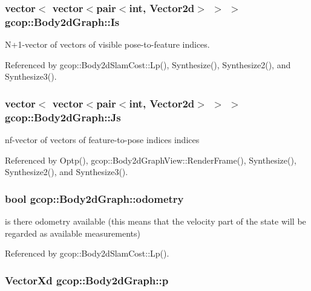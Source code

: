 \subsubsection[{\-Is}]{\setlength{\rightskip}{0pt plus 5cm}vector$<$ vector$<$pair$<$int, \-Vector2d$>$ $>$ $>$ {\bf gcop\-::\-Body2d\-Graph\-::\-Is}}\label{classgcop_1_1Body2dGraph_a3f5071e7dd098489d1cafe5778c079d6}


\-N+1-\/vector of vectors of visible pose-\/to-\/feature indices. 



\-Referenced by gcop\-::\-Body2d\-Slam\-Cost\-::\-Lp(), \-Synthesize(), \-Synthesize2(), and \-Synthesize3().

\subsubsection[{\-Js}]{\setlength{\rightskip}{0pt plus 5cm}vector$<$ vector$<$pair$<$int, \-Vector2d$>$ $>$ $>$ {\bf gcop\-::\-Body2d\-Graph\-::\-Js}}\label{classgcop_1_1Body2dGraph_af3e2abdafdabc7ca66fc00be8bdc31a2}


nf-\/vector of vectors of feature-\/to-\/pose indices indices 



\-Referenced by \-Optp(), gcop\-::\-Body2d\-Graph\-View\-::\-Render\-Frame(), \-Synthesize(), \-Synthesize2(), and \-Synthesize3().

\subsubsection[{odometry}]{\setlength{\rightskip}{0pt plus 5cm}bool {\bf gcop\-::\-Body2d\-Graph\-::odometry}}\label{classgcop_1_1Body2dGraph_aa1827913d541ae7b1953f203392e9555}


is there odometry available (this means that the velocity part of the state will be regarded as available measurements) 



\-Referenced by gcop\-::\-Body2d\-Slam\-Cost\-::\-Lp().

\subsubsection[{p}]{\setlength{\rightskip}{0pt plus 5cm}\-Vector\-Xd {\bf gcop\-::\-Body2d\-Graph\-::p}}\label{classgcop_1_1Body2dGraph_a3ef879ec6e44250b0bdcb6183f9aeec3}


